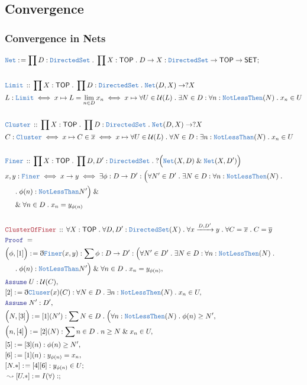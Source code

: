 \documentclass[12pt]{scrartcl}
\newcommand{\TYPE}[1]{\textcolor{NavyBlue}{\mathtt{#1}}}
\newcommand{\LOGIC}[1]{\textcolor{Blue}{\mathtt{#1}}}
\newcommand{\THM}[1]{\textcolor{Maroon}{\mathtt{#1}}}
\renewcommand{\.}{\; . \;}
\newcommand{\de}{: \kern 0.1pc =}
\newcommand{\Theorem}[2]{& \THM{#1} \, :: \, #2 \\ & \Proof = \\ }
\newcommand{\DeclareType}[2]{& \TYPE{#1} \, :: \, #2 \\}
\newcommand{\DefineNamedType}[4]{& #1 : \TYPE{#2} \iff #3 \iff #4 \\}
\newcommand{\NewLine}{\\ & \kern 1pc}
\newcommand{\Page}[1]{ \begin{align*} #1 \end{align*}   }
\newcommand{ \bd }{ \ByDef }
\renewcommand{\And}{\; \& \;}
\newcommand{\Arrow}{\xrightarrow}
\newcommand{\Say}[3]{& #1 \de #2 : #3, \\}
\newcommand{\Conclude}[3]{& #1 \de #2 : #3; \\}
\newcommand{\DeriveConclude}[3]{& \leadsto #1 \de #2 : #3 ; \\}
\newcommand{\Assume}[2]{& \LOGIC{Assume} \; #1 : #2, \\}
\newcommand{\ByDef}{\eth}
\newcommand{\Proof}{\LOGIC{Proof} \; }
\newcommand{\SET}{\mathsf{SET}}
\newcommand{\TOP}{\mathsf{TOP}}
\newcommand{\U}{\mathcal{U}}
\begin{document}
\subsection{Convergence}
\subsubsection{Convergence in Nets}
\Page{
	\Conclude{\TYPE{Net}}{\prod D : \TYPE{DirectedSet} \. \prod X : \TOP \. D \to X }
	{
		\TYPE{DirectedSet} \to \TOP \to \SET
	}
	\\
	\DeclareType{Limit}{ \prod X : \TOP \. \prod D : \TYPE{DirectedSet} \. \TYPE{Net}(D,X) \to ?X}
	\DefineNamedType{L}{Limit}{ x \mapsto  L = \lim_{n \in D} x_n}
	{
		x \mapsto
		\forall U \in \U(L) \.
		\exists N \in D : 
		\forall n : \TYPE{NotLessThen}(N) \.
		x_n \in U
	}
	\\
	\DeclareType{Cluster}{ \prod X : \TOP \. \prod D : \TYPE{DirectedSet} \. \TYPE{Net}(D,X) \to ?X}
	\DefineNamedType{C}{Cluster}{ x \mapsto  C \in \overline{x}}
	{
		x \mapsto
		\forall U \in \U(L) \.
		\forall N \in D : 
		\exists n : \TYPE{NotLessThan}(N) \.
		x_n \in U
	}
	\\
	\DeclareType{Finer}{
		\prod X : \TOP \. 
		\prod D,D' : \TYPE{DirectedSet}  \. 
		?\Big( \TYPE{Net}(X,D) \And \TYPE{Net}(X,D') \Big)
	}
	\DefineNamedType{x,y}{Finer}{x \to y}
	{
		\exists \phi : D \to D' : 
		\Big(\forall N' \in D' \. \exists N \in D : \forall n : \TYPE{NotLessThen}(N) \. \NewLine \.
			\phi(n) : \TYPE{NotLessThan} N'\Big) \And \NewLine \And 
		\forall n \in D \.  x_n = y_{\phi(n)} 
	}
	\\
	\Theorem{ClusterOfFiner}
	{
		\forall X : \TOP \.
		\forall D,D' : \TYPE{DirectedSet}(X) \.
		\forall  x \Arrow{D,D'} y \.
		\forall C = \overline{x} \.
		C = \overline{y}
	}
	\Say{\Big(\phi, [1] \Big)}{ \bd \TYPE{Finer}(x,y) }
	{
		\sum \phi : D \to D' : 
		\Big(\forall N' \in D' \. \exists N \in D : \forall n : \TYPE{NotLessThen}(N) \. \NewLine \.
			\phi(n) : \TYPE{NotLessThan} N'\Big) \And 
		\forall n \in D \.  x_n = y_{\phi(n)} 
	}
	\Assume{U}{\U(C)}
	\Say{[2]}{\bd \TYPE{Cluser}(x)(C) }
	{
		\forall N \in D \. \exists n : \TYPE{NotLessThen}(N) \. x_n \in U
	}
	\Assume{N'}{D'}
	\Say{\Big(N,[3]\Big)}{[1](N')}{
		\sum N \in D \.  \Big( 
		\forall n : \TYPE{NotLessThen}(N) \. 
		\phi(n) \ge N'
	}
	\Say{\Big(n,[4]\Big)}{[2](N)}
	{
		\sum n \in D \. n \ge N  \And x_n \in U
	}
	\Say{[5]}{[3](n)}{\phi(n) \ge N'}
	\Say{[6]}{[1](n)}{  y_{\phi(n)} = x_n   }
	\Conclude{[N.*]}{[4][6]}{  y_{\phi(n)} \in U  }
	\DeriveConclude{[U.*]}{ I(\forall) }{ 
}}
\end{document}

